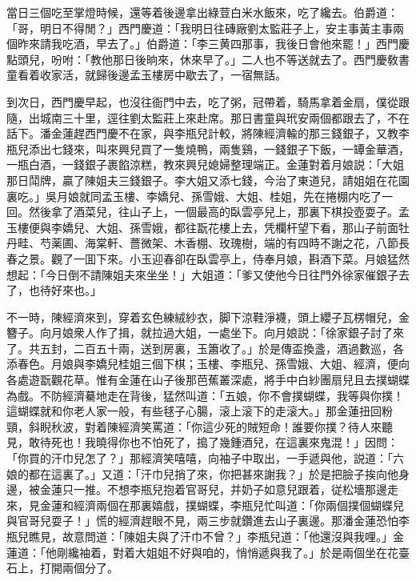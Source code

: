 當日三個吃至掌燈時候，還等着後邊拿出綠荳白米水飯來，吃了纔去。伯爵道：「哥，明日不得閒？」西門慶道：「我明日往磚廠劉太監莊子上，安主事黃主事兩個昨來請我吃酒，早去了。」伯爵道：「李三黄四那事，我後日會他來罷！」西門慶點頭兒，吩咐：「教他那日後晌來，休來早了。」二人也不等送就去了。西門慶敎書童看着收家活，就歸後邊孟玉樓房中歇去了，一宿無話。

到次日，西門慶早起，也沒往衙門中去，吃了粥，冠帶着，騎馬拿着金扇，僕從跟隨，出城南三十里，逕往劉太監莊上來赴席。那日書童與玳安兩個都跟去了，不在話下。潘金蓮趕西門慶不在家，與李瓶兒計較，將陳經濟輸的那三錢銀子，又教李瓶兒添出七錢來，叫來興兒買了一隻燒鴨，兩隻鷄，一錢銀子下飯，一罈金華酒，一瓶白酒，一錢銀子裹餡涼糕，教來興兒媳婦整理端正。金蓮對着月娘説：「大姐那日鬦牌，贏了陳姐夫三錢銀子。李大姐又添七錢，今治了東道兒，請姐姐在花園裏吃。」吳月娘就同孟玉樓、李嬌兒、孫雪娥、大姐、桂姐，先在捲棚内吃了一回。然後拿了酒菜兒，往山子上，一個最高的臥雲亭兒上，那裏下棋投壺耍子。孟玉樓便與李嬌兒、大姐、孫雪娥，都往翫花樓上去，凭欄杆望下看，那山子前面牡丹畦、芍薬圃、海棠軒、薔微架、木香棚、玫瑰樹，端的有四時不謝之花，八節長春之景。觀了一囬下來。小玉迎春卻在臥雲亭上，侍奉月娘，斟酒下菜。月娘猛然想起：「今日倒不請陳姐夫來坐坐！」大姐道：「爹又使他今日往門外徐家催銀子去了，也待好來也。」

不一時，陳經濟來到，穿着玄色練絨紗衣，脚下涼鞋淨襪，頭上纓子瓦楞帽兒，金簪子。向月娘衆人作了揖，就拉過大姐，一處坐下。向月娘説：「徐家銀子討了來了。共五封，二百五十兩，送到房裏，玉簫收了。」於是傳盃換盞，酒過數巡，各添春色。月娘與李嬌兒桂姐三個下棋；玉樓、李瓶兒、孫雪娥、大姐、經濟，便向各處遊翫觀花草。惟有金蓮在山子後那芭蕉叢深處，將手中白紗團扇兒且去撲蝴蝶為戲。不防經濟驀地走在背後，猛然叫道：「五娘，你不會撲蝴蝶，我等與你撲！這蝴蝶就和你老人家一般，有些毬子心腸，滚上滚下的走滚大。」那金蓮扭回粉頸，斜睨秋波，對着陳經濟笑罵道：「你這少死的賊短命！誰要你撲？待人來聽見，敢待死也！我曉得你也不怕死了，搗了幾鍾酒兒，在這裏來鬼混！」因問：「你買的汗巾兒怎了？」那經濟笑嘻嘻，向袖子中取出，一手遞與他，説道：「六娘的都在這裏了。」又道：「汗巾兒捎了來，你把甚來謝我？」於是把臉子挨向他身邊，被金蓮只一推。不想李瓶兒抱着官哥兒，并奶子如意兒跟着，従松墻那邊走來，見金蓮和經濟兩個在那裏嬉戲，撲蝴蝶，李瓶兒忙叫道：「你兩個撲個蝴蝶兒與官哥兒耍子！」慌的經濟趕眼不見，兩三步就鑽進去山子裏邊。那潘金蓮恐怕李瓶兒瞧見，故意問道：「陳姐夫與了汗巾不曾？」李瓶兒道：「他還沒與我哩。」金蓮道：「他剛纔袖着，對着大姐姐不好與咱的，悄悄遞與我了。」於是兩個坐在花臺石上，打開兩個分了。

